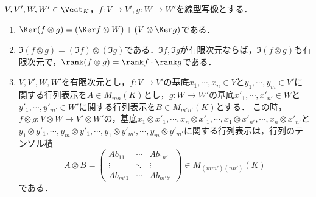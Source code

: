 \documentclass[uplatex, dvipdfmx]{jsreport}
\begin{document}
\begin{proposition}[テンソル積の行列表示]\label{prop-tensor-product-of-matrices}
    $V,V',W,W'\in\Vect_K$，$f:V\to V',g:W\to W'$を線型写像とする．
    \begin{enumerate}
        \item $\Ker(f\otimes g)=(\Ker f\otimes W)+(V\otimes\Ker g)$である．
        \item $\Im(f\otimes g)=(\Im f)\otimes(\Im g)$である．$\Im f,\Im g$が有限次元ならば，$\Im(f\otimes g)$も有限次元で，$\rank(f\otimes g)=\rank f\cdot\rank g$である．
        \item $V,V',W,W'$を有限次元とし，$f:V\to V'$の基底$x_1,\cdots,x_n\in V$と$y_1,\cdots,y_m\in V'$に関する行列表示を$A\in M_{mn}(K)$とし，$g:W\to W'$の基底$x'_1,\cdots,x'_{n'}\in W$と$y'_1,\cdots,y'_{m'}\in W'$に関する行列表示を$B\in M_{m'n'}(K)$とする．
        この時，$f\otimes g:V\otimes W\to V'\otimes W'$の，基底$x_1\otimes x'_1,\cdots,x_n\otimes x'_1,\cdots,x_1\otimes x'_{n'},\cdots,x_n\otimes x'_{n'}$と$y_1\otimes y'_1,\cdots,y_m\otimes y'_1,\cdots,y_1\otimes y'_{m'},\cdots,y_m\otimes y'_{m'}$に関する行列表示は，行列のテンソル積
        \[A\otimes B=\begin{pmatrix}Ab_{11}&\cdots&Ab_{1n'}\\\vdots&\ddots&\vdots\\Ab_{m'1}&\cdots&Ab_{m'b'}\end{pmatrix}\in M_{(mm')(nn')}(K)\]
        である．
    \end{enumerate}
\end{proposition}
\end{document}

